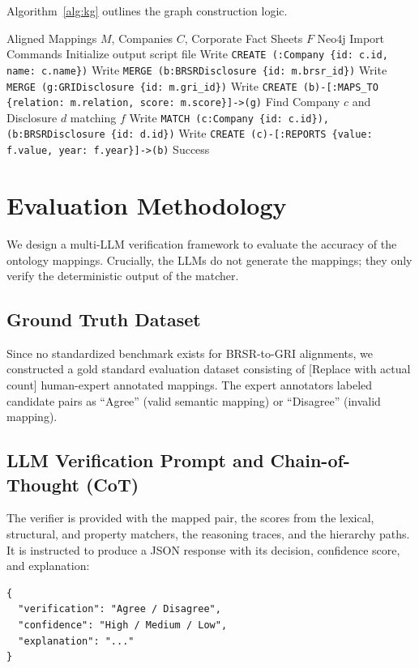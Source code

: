 \documentclass[journal,compsoc]{IEEEtran}
\begin{document}
\begin{itemize}
Algorithm~\ref{alg:kg} outlines the graph construction logic.

\begin{algorithm}
\caption{ESG Knowledge Graph Construction}
\label{alg:kg}
\begin{algorithmic}[1]
\REQUIRE Aligned Mappings $M$, Companies $C$, Corporate Fact Sheets $F$
\ENSURE Neo4j Import Commands
\STATE Initialize output script file
    \STATE Write \texttt{CREATE (:Company \{id: c.id, name: c.name\})}
\ENDFOR
{}
    \STATE Write \texttt{MERGE (b:BRSRDisclosure \{id: m.brsr\_id\})}
    \STATE Write \texttt{MERGE (g:GRIDisclosure \{id: m.gri\_id\})}
    \STATE Write \texttt{CREATE (b)-[:MAPS\_TO \{relation: m.relation, score: m.score\}]->(g)}
\ENDFOR
{}
    \STATE Find Company $c$ and Disclosure $d$ matching $f$
    \STATE Write \texttt{MATCH (c:Company \{id: c.id\}), (b:BRSRDisclosure \{id: d.id\})}
    \STATE Write \texttt{CREATE (c)-[:REPORTS \{value: f.value, year: f.year\}]->(b)}
\ENDFOR
\RETURN Success
\end{algorithmic}
\end{algorithm}

\section{Evaluation Methodology}
We design a multi-LLM verification framework to evaluate the accuracy of the ontology mappings. Crucially, the LLMs do not generate the mappings; they only verify the deterministic output of the matcher.

\subsection{Ground Truth Dataset}
Since no standardized benchmark exists for BRSR-to-GRI alignments, we constructed a gold standard evaluation dataset consisting of [Replace with actual count] human-expert annotated mappings. The expert annotators labeled candidate pairs as ``Agree'' (valid semantic mapping) or ``Disagree'' (invalid mapping).

\subsection{LLM Verification Prompt and Chain-of-Thought (CoT)}
The verifier is provided with the mapped pair, the scores from the lexical, structural, and property matchers, the reasoning traces, and the hierarchy paths. It is instructed to produce a JSON response with its decision, confidence score, and explanation:
\begin{verbatim}
{
  "verification": "Agree / Disagree",
  "confidence": "High / Medium / Low",
  "explanation": "..."
}
\end{verbatim}


\end{itemize}
\end{document}
